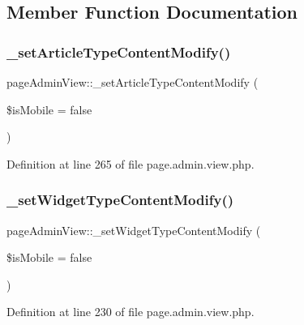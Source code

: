 \subsection{Member Function Documentation}
\hypertarget{classpageAdminView_a16835f9ce285adc6c4bf0f144495230f}{}\label{classpageAdminView_a16835f9ce285adc6c4bf0f144495230f} 
\subsubsection{\texorpdfstring{\+\_\+set\+Article\+Type\+Content\+Modify()}{\_setArticleTypeContentModify()}}
{\footnotesize\ttfamily page\+Admin\+View\+::\+\_\+set\+Article\+Type\+Content\+Modify (\begin{DoxyParamCaption}\item[{}]{\$is\+Mobile = {\ttfamily false} }\end{DoxyParamCaption})}



Definition at line 265 of file page.\+admin.\+view.\+php.

\hypertarget{classpageAdminView_a722e1c87ff39044b2ce170f9f7bc5b68}{}\label{classpageAdminView_a722e1c87ff39044b2ce170f9f7bc5b68} 
\subsubsection{\texorpdfstring{\+\_\+set\+Widget\+Type\+Content\+Modify()}{\_setWidgetTypeContentModify()}}
{\footnotesize\ttfamily page\+Admin\+View\+::\+\_\+set\+Widget\+Type\+Content\+Modify (\begin{DoxyParamCaption}\item[{}]{\$is\+Mobile = {\ttfamily false} }\end{DoxyParamCaption})}



Definition at line 230 of file page.\+admin.\+view.\+php.

\hypertarget{classpageAdminView_a71a15a59e58bbe4f47af8c051850ad15}{}\label{classpageAdminView_a71a15a59e58bbe4f47af8c051850ad15} 
